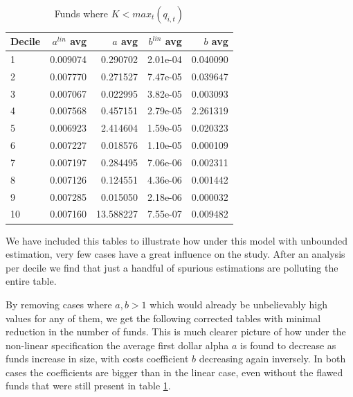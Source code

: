 \documentclass[12pt]{article}
\begin{document}
\begin{table}[H]
    \centering
    \caption{Funds where $K<max_t(q_{i,t})$}
    \label{tab:estimates-deciles-k<max2}
    \begin{tabular}{lrrrr}
        \toprule
        Decile & $a^{lin}$ avg & $a$ avg & $b^{lin}$ avg & $b$ avg \\
        \midrule
        1 & 0.009074 & 0.290702 & 2.01e-04 & 0.040090 \\
        2 & 0.007770 & 0.271527 & 7.47e-05 & 0.039647 \\
        3 & 0.007067 & 0.022995 & 3.82e-05 & 0.003093 \\
        4 & 0.007568 & 0.457151 & 2.79e-05 & 2.261319 \\
        5 & 0.006923 & 2.414604 & 1.59e-05 & 0.020323 \\
        6 & 0.007227 & 0.018576 & 1.10e-05 & 0.000109 \\
        7 & 0.007197 & 0.284495 & 7.06e-06 & 0.002311 \\
        8 & 0.007126 & 0.124551 & 4.36e-06 & 0.001442 \\
        9 & 0.007285 & 0.015050 & 2.18e-06 & 0.000032 \\
        10 & 0.007160 & 13.588227 & 7.55e-07 & 0.009482 \\
        \bottomrule
    \end{tabular}
\end{table}

We have included this tables to illustrate how under this model with unbounded estimation, very few cases have a great influence on the study. After an analysis per decile we find that just a handful of spurious estimations are polluting the entire table. 
\par By removing cases where $a,b>1$ which would already be unbelievably high values for any of them, we get the following corrected tables with minimal reduction in the number of funds. This is much clearer picture of how under the non-linear specification the average first dollar alpha $a$ is found to decrease as funds increase in size, with costs coefficient $b$ decreasing again inversely. In both cases the coefficients are bigger than in the linear case, even without the flawed funds that were still present in table \ref{tab:estimates-deciles-k<max2}.
            
\end{document}
